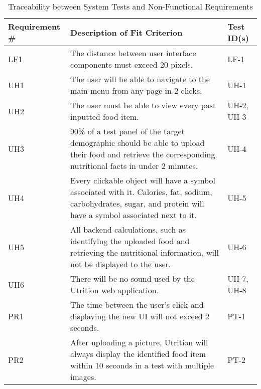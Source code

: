 \documentclass[12pt, titlepage]{article}
\begin{document}
	\begin{table}[H]
		\caption{Traceability between System Tests and Non-Functional Requirements}
		\begin{tabularx}{\linewidth}{|l|X|l|}
			\hline
			{\bf Requirement \#} & {\bf Description of Fit Criterion} & {\bf Test ID(s)}\\
			\hline
			LF1 & The distance between user interface components must exceed 20 pixels. & LF-1 \\
			\hline
			UH1 & The user will be able to navigate to the main menu from any page in 2 clicks. & UH-1 \\
			\hline
			UH2 & The user must be able to view every past inputted food item. & UH-2, UH-3 \\
			\hline
			UH3 & 90\% of a test panel of the target demographic should be able to upload their food and retrieve the corresponding nutritional facts in under 2 minutes. & UH-4 \\
			\hline
			UH4 & Every clickable object will have a symbol associated with it. Calories, fat, sodium, carbohydrates, sugar, and protein will have a symbol associated next to it.
			& UH-5 \\
			\hline
			UH5 & All backend calculations, such as identifying the uploaded food and retrieving the nutritional information, will not be displayed to the user. & UH-6 \\
			\hline
			UH6 & There will be no sound used by the Utrition web application.  & UH-7, UH-8 \\
			\hline
			PR1 & The time between the user’s click and displaying the new UI will not exceed 2 seconds. & PT-1 \\
			\hline
			PR2 & After uploading a picture, Utrition will always display the 
			identified food item within 10 seconds in a test with multiple 
			images. & PT-2 \\
			\hline
		\end{tabularx}
		\label{tab:Non-Functional Traceability}
	\end{table}
\end{document}

